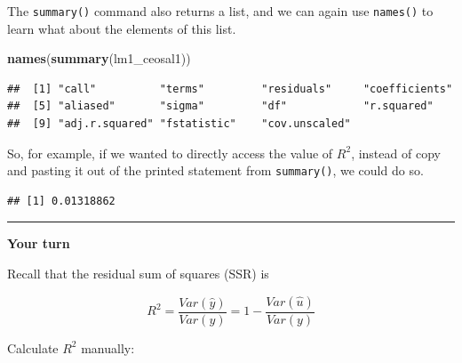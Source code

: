\documentclass[]{book}
\newenvironment{Shaded}{\begin{snugshade}}{\end{snugshade}}
\newcommand{\KeywordTok}[1]{\textcolor[rgb]{0.13,0.29,0.53}{\textbf{#1}}}
\newcommand{\NormalTok}[1]{#1}
\newcommand{\OperatorTok}[1]{\textcolor[rgb]{0.81,0.36,0.00}{\textbf{#1}}}
\begin{document}
The \texttt{summary()} command also returns a list, and we can again use
\texttt{names()} to learn what about the elements of this list.

\begin{Shaded}
\begin{Highlighting}[]
\KeywordTok{names}\NormalTok{(}\KeywordTok{summary}\NormalTok{(lm1_ceosal1))}
\end{Highlighting}
\end{Shaded}

\begin{verbatim}
##  [1] "call"          "terms"         "residuals"     "coefficients" 
##  [5] "aliased"       "sigma"         "df"            "r.squared"    
##  [9] "adj.r.squared" "fstatistic"    "cov.unscaled"
\end{verbatim}

So, for example, if we wanted to directly access the value of \(R^2\),
instead of copy and pasting it out of the printed statement from
\texttt{summary()}, we could do so.

\begin{Shaded}
\end{Shaded}

\begin{verbatim}
## [1] 0.01318862
\end{verbatim}

\begin{center}\rule{0.5\linewidth}{\linethickness}\end{center}

\textbf{Your turn}

Recall that the residual sum of squares (SSR) is

\begin{equation}
R^2 = \frac{Var(\hat{y})}{Var(y)} = 1 - \frac{Var(\hat{u})}{Var(y)} 
\end{equation}

Calculate \(R^2\) manually:

\begin{Shaded}
\end{Shaded}
\end{document}
